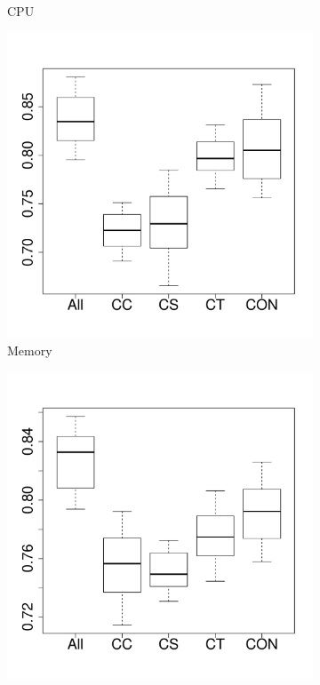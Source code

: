 \documentclass[10pt,journal,compsoc]{IEEEtran}
\begin{document}
\begin{figure}[t]
\begin{subfigure}{0.19\textwidth}
                \caption{CPU}
        \end{subfigure}%
        \begin{subfigure}{0.19\textwidth}
                \includegraphics[width=\linewidth]{Figures/mem-cassandrakeep-importance.pdf}
                \caption{Memory}
        \end{subfigure}%
        \begin{subfigure}{0.19\textwidth}
                \includegraphics[width=\linewidth]{Figures/ioread-cassandrakeep-importance.pdf}

\end{subfigure}
\end{figure}
\end{document}
